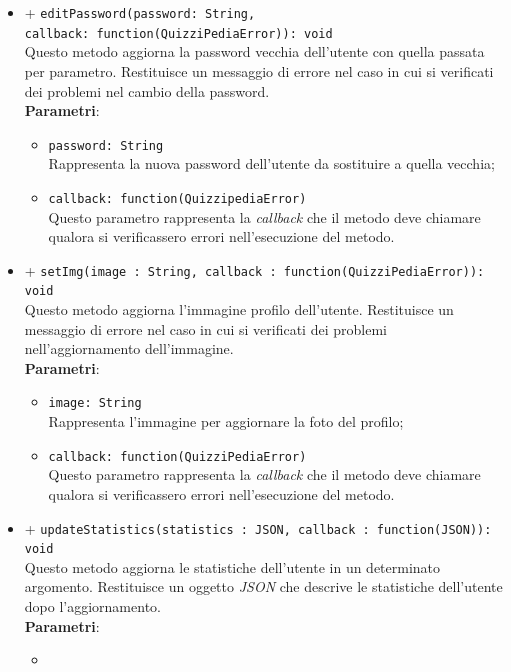 \begin{itemize}
\begin{itemize}
		\item	
		+ \texttt{editPassword(password: String, \\callback: function(QuizziPediaError)): void} \\
		Questo metodo aggiorna la password vecchia dell'utente con quella passata per parametro. Restituisce un messaggio di errore nel caso in cui si verificati dei problemi nel cambio della password.	\\
		\textbf{Parametri}: 
			\begin{itemize}
			\item
				\texttt{password: String} \\
				Rappresenta la nuova password dell'utente da sostituire a quella vecchia;
			\item	
				\texttt{callback: function(QuizzipediaError)} \\
				Questo parametro rappresenta la \textit{callback} che il metodo deve chiamare qualora si verificassero errori nell'esecuzione del metodo.
			\end{itemize}
		\item	
		+ \texttt{setImg(image : String, callback : function(QuizziPediaError)): void} \\	
		Questo metodo aggiorna l'immagine profilo dell'utente. Restituisce un messaggio di errore nel caso in cui si verificati dei problemi nell'aggiornamento dell'immagine.	\\	
		\textbf{Parametri}: 
			\begin{itemize}
			\item
				\texttt{image: String} \\
				Rappresenta l'immagine per aggiornare la foto del profilo;
			\item	
				\texttt{callback: function(QuizziPediaError)} \\
				Questo parametro rappresenta la \textit{callback} che il metodo deve chiamare qualora si verificassero errori nell'esecuzione del metodo.
			\end{itemize}
		\item	
		+ \texttt{updateStatistics(statistics : JSON, callback : function(JSON)): void} \\	
		Questo metodo aggiorna le statistiche dell'utente in un determinato argomento. Restituisce un oggetto \textit{JSON} che descrive le statistiche dell'utente dopo l'aggiornamento.	\\	
		\textbf{Parametri}: 
			\begin{itemize}
			\item

\end{itemize}
\end{itemize}
\end{itemize}
